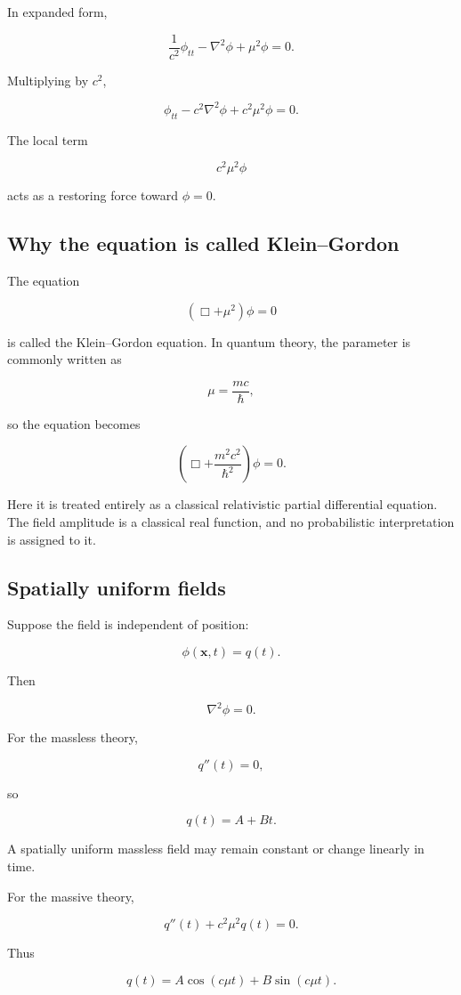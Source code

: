 In expanded form,

\[
\boxed{
\frac{1}{c^{2}}\phi_{tt}
-
\nabla^{2}\phi
+
\mu^{2}\phi
=0
}.
\]

Multiplying by \(c^{2}\),

\[
\boxed{
\phi_{tt}
-
c^{2}\nabla^{2}\phi
+
c^{2}\mu^{2}\phi
=0
}.
\]

The local term

\[
c^{2}\mu^{2}\phi
\]

acts as a restoring force toward \(\phi=0\).

\subsection{Why the equation is called Klein--Gordon}

The equation

\[
(\Box+\mu^{2})\phi=0
\]

is called the Klein--Gordon equation. In quantum theory, the parameter is commonly written as

\[
\mu=\frac{mc}{\hbar},
\]

so the equation becomes

\[
\left(
\Box+
\frac{m^{2}c^{2}}{\hbar^{2}}
\right)
\phi=0.
\]

Here it is treated entirely as a classical relativistic partial differential equation. The field amplitude is a classical real function, and no probabilistic interpretation is assigned to it.

\subsection{Spatially uniform fields}

Suppose the field is independent of position:

\[
\phi(\mathbf{x},t)=q(t).
\]

Then

\[
\nabla^{2}\phi=0.
\]

For the massless theory,

\[
q''(t)=0,
\]

so

\[
\boxed{
q(t)=A+Bt
}.
\]

A spatially uniform massless field may remain constant or change linearly in time.

For the massive theory,

\[
q''(t)+c^{2}\mu^{2}q(t)=0.
\]

Thus

\[
\boxed{
q(t)
=
A\cos(c\mu t)
+
B\sin(c\mu t)
}.
\]

